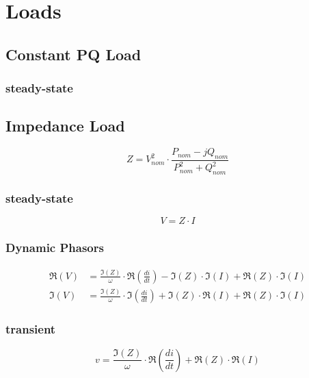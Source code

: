 \section{Loads}

\subsection{Constant PQ Load}

\subsubsection{steady-state}

\subsection{Impedance Load}

\begin{equation}
	Z = V_{nom}^2 \cdot \frac{P_{nom}-jQ_{nom}}{P_{nom}^2+Q_{nom}^2}
\end{equation}

\subsubsection{steady-state}
\begin{equation}
	V = Z \cdot I
\end{equation}

\subsubsection{Dynamic Phasors}
\begin{align}
	\Re(V) &= \frac{\Im(Z)}{\omega} \cdot \Re \left(\frac{di}{dt} \right) - \Im(Z) \cdot \Im(I) + \Re(Z) \cdot \Im(I) \\
    \Im(V) &=\frac{\Im(Z)}{\omega} \cdot \Im \left(\frac{di}{dt} \right) + \Im(Z) \cdot \Re(I) + \Re(Z) \cdot \Im(I)
\end{align}

\subsubsection{transient}
\begin{equation}
	 v = \frac{\Im(Z)}{\omega} \cdot \Re \left(\frac{di}{dt} \right) + \Re(Z) \cdot \Re(I)
\end{equation}
